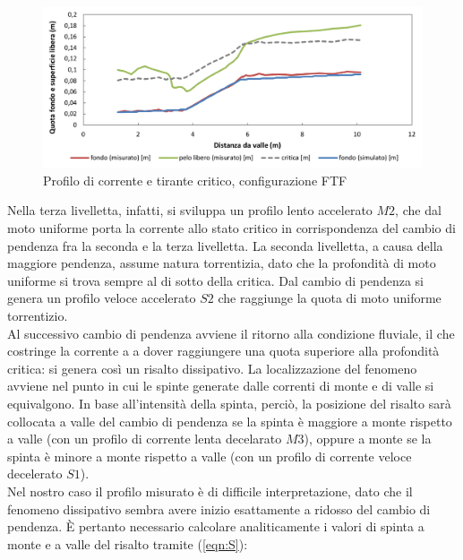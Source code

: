 \documentclass[12pt]{article} %
\begin{document}
\begin{figure}[H]
    \centering
    \includegraphics[width=\textwidth]{FTFbasecritica.png}
    \caption{Profilo di corrente e tirante critico, configurazione FTF}
    \label{fig:critica_FTF}
\end{figure}

\noindent  Nella terza livelletta, infatti, si sviluppa un profilo lento accelerato $M2$, che dal moto uniforme porta la corrente allo stato critico in corrispondenza del cambio di pendenza fra la seconda e la terza livelletta. La seconda livelletta, a causa della maggiore pendenza, assume natura torrentizia, dato che la profondità di moto uniforme si trova sempre al di sotto della critica. Dal cambio di pendenza si genera un profilo veloce accelerato $S2$ che raggiunge la quota di moto uniforme torrentizio. \\
Al successivo cambio di pendenza avviene il ritorno alla condizione fluviale, il che costringe la corrente a a dover raggiungere una quota superiore alla profondità critica: si genera così un risalto dissipativo. La localizzazione del fenomeno avviene nel punto in cui le spinte generate dalle correnti di monte e di valle si equivalgono. In base all'intensità della spinta, perciò, la posizione del risalto sarà collocata a valle del cambio di pendenza se la spinta è maggiore a monte rispetto a valle (con un profilo di corrente lenta decelarato $M3$), oppure a monte se la spinta è minore a monte rispetto a valle (con un profilo di corrente veloce decelerato $S1$).\\
Nel nostro caso il profilo misurato è di difficile interpretazione, dato che il fenomeno dissipativo sembra avere inizio esattamente a ridosso del cambio di pendenza. È pertanto necessario calcolare analiticamente i valori di spinta a monte e a valle del risalto tramite (\ref{eqn:S}):
\end{document}
